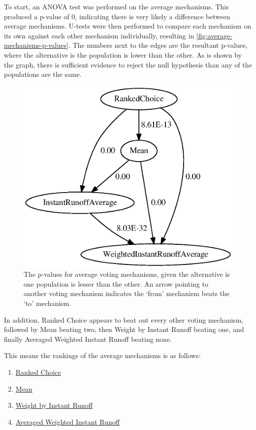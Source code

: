 To start, an ANOVA test was performed on the average mechanisms.
This produced a p-value of 0, indicating there is very likely a difference between
average mechanisms.
U-tests were then performed to compare each mechanism on its own against each other
mechanism individually, resulting in \autoref{fig:average-mechanisms-p-values}.
The numbers next to the edges are the resultant p-values, where the alternative is
the population is lower than the other.
As is shown by the graph, there is sufficient evidence to reject the null hypothesis
than any of the populations are the same.

\begin{figure}[htbp]
    \centering
    \includegraphics[scale=0.75]
    {./content/figures/average-mechanisms-p-values.gv}
    \caption{The p-values for average voting mechanisms, given the alternative is one
    population is lesser than the other.
    An arrow pointing to another voting mechanism indicates the `from' mechanism
    beats the `to' mechanism.}
    \label{fig:average-mechanisms-p-values}
\end{figure}

In addition, Ranked Choice appears to beat out every other voting mechanism, followed
by Mean beating two, then Weight by Instant Runoff beating one, and finally Averaged
Weighted Instant Runoff beating none.
\begin{samepage}
    This means the rankings of the average mechanisms is as follows:
    \begin{enumerate}
        \item \hyperref[para:avg-ranked-choice]{Ranked Choice}
        \item \hyperref[para:mean]{Mean}
        \item \hyperref[para:avg-instant-runoff]{Weight by Instant Runoff}
        \item \hyperref[para:avg-weighted-instant-runoff]{Averaged Weighted Instant
        Runoff}
    \end{enumerate}
\end{samepage}

